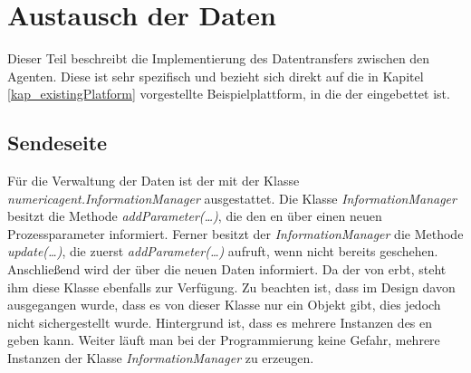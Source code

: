 	\section{Austausch der Daten}\label{kap_dataman_austausch}
	Dieser Teil beschreibt die Implementierung des Datentransfers zwischen den Agenten. Diese ist sehr spezifisch und bezieht sich direkt auf die in Kapitel \ref{kap_existingPlatform} vorgestellte Beispielplattform, in die der \repag{} eingebettet ist.
	
	\subsection{Sendeseite}
	Für die Verwaltung der Daten ist der \numag{} mit der Klasse \emph{numericagent.InformationManager} ausgestattet. Die Klasse \emph{InformationManager} besitzt die Methode \emph{addParameter(\ldots)}, die den \repag{}en über einen neuen Prozessparameter informiert. Ferner besitzt der \emph{InformationManager} die Methode \emph{update(\ldots)}, die zuerst \emph{addParameter(\ldots)} aufruft, wenn nicht bereits geschehen. Anschließend wird der \repag{} über die neuen Daten informiert.\parag{}
	Da der \calcag{} von \numag{} erbt, steht ihm diese Klasse ebenfalls zur Verfügung. Zu beachten ist, dass im Design davon ausgegangen wurde, dass es von dieser Klasse nur ein Objekt gibt, dies jedoch nicht sichergestellt wurde. Hintergrund ist, dass es mehrere Instanzen des \repag{}en geben kann. Weiter läuft man bei der Programmierung keine Gefahr, mehrere Instanzen der Klasse \emph{InformationManager} zu erzeugen.

